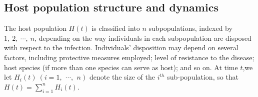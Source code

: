 \documentclass[a4paper]{article}
\newcommand{\dsum}{\displaystyle\sum}
\begin{document}
\subsection{Host population structure and dynamics}\label{subsec.Assumption2}
The host population $H(t)$ is classified into $n$ subpopulations, indexed by $1,~2,~ \cdots,~ n$, depending on the way individuals in each subpopulation are disposed with respect to the infection. Individuals' disposition may depend on several factors, including protective measures employed; level of resistance to the disease; host species (if more than one species can serve as host); and so on.  
 At time $t$,we let $H_i(t)~(i=1,~\,\cdots,~\,n)$ denote the size of the $i^{th}$ sub-population, so that $H(t) = {\dsum_{i=1}^n} H_i(t)$. 
\end{document}
